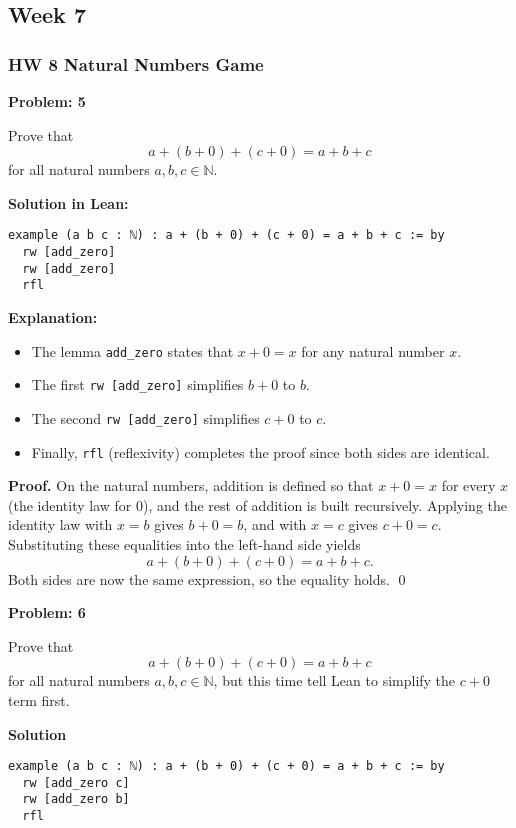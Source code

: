 \documentclass{article}
\theoremstyle{theorem}
\theoremstyle{definition}
\theoremstyle{remark}
\begin{document}
\subsection{Week 7}
\subsubsection{HW 8 Natural Numbers Game}
\textbf{Problem: 5}

Prove that
\[
a + (b + 0) + (c + 0) = a + b + c
\]
for all natural numbers \(a, b, c \in \mathbb{N}\).

\medskip
\textbf{Solution in Lean:}

\begin{verbatim}
example (a b c : ℕ) : a + (b + 0) + (c + 0) = a + b + c := by
  rw [add_zero]
  rw [add_zero]
  rfl
\end{verbatim}

\textbf{Explanation:}
\begin{itemize}
    \item The lemma \texttt{add\_zero} states that \(x + 0 = x\) for any natural number \(x\).
    \item The first \texttt{rw [add\_zero]} simplifies \(b + 0\) to \(b\).
    \item The second \texttt{rw [add\_zero]} simplifies \(c + 0\) to \(c\).
    \item Finally, \texttt{rfl} (reflexivity) completes the proof since both sides are identical.
\end{itemize}
\textbf{Proof.}
On the natural numbers, addition is defined so that $x+0=x$ for every $x$
(the identity law for $0$), and the rest of addition is built recursively.
Applying the identity law with $x=b$ gives $b+0=b$, and with $x=c$ gives
$c+0=c$. Substituting these equalities into the left-hand side yields
\[
a + (b+0) + (c+0) = a + b + c.
\]
Both sides are now the same expression, so the equality holds. \qed


\textbf{Problem: 6}

Prove that
\[
a + (b + 0) + (c + 0) = a + b + c
\]
for all natural numbers \(a, b, c \in \mathbb{N}\), but this time tell Lean to simplify the \(c + 0\) term first.

\medskip
\textbf{Solution}

\begin{verbatim}
example (a b c : ℕ) : a + (b + 0) + (c + 0) = a + b + c := by
  rw [add_zero c]
  rw [add_zero b]
  rfl
\end{verbatim}
\end{document}
